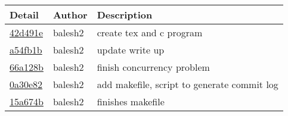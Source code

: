 \begin{tabular}{l l l}\textbf{Detail} & \textbf{Author} & \textbf{Description}\\\hline
\href{https://github.com/balesh2/CS444-write-up-1/commit/42d491ee4c85c1fb33946119ef4ccd85bc7a22d9}{42d491e} & balesh2 & create tex and c program\\\hline
\href{https://github.com/balesh2/CS444-write-up-1/commit/a54fb1bd1cbc1bba8d00c19603d0c71cd2b341ce}{a54fb1b} & balesh2 & update write up\\\hline
\href{https://github.com/balesh2/CS444-write-up-1/commit/66a128b6cb787630ca5ee018be159e8916a0d639}{66a128b} & balesh2 & finish concurrency problem\\\hline
\href{https://github.com/balesh2/CS444-write-up-1/commit/0a30e82f7164fd99630aa3bc042ef80799391d23}{0a30e82} & balesh2 & add makefile, script to generate commit log\\\hline
\href{https://github.com/balesh2/CS444-write-up-1/commit/15a674b748965d1b7e9fb3f91cc396f0b858b991}{15a674b} & balesh2 & finishes makefile\\\hline\end{tabular}
